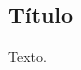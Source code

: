 

\begin{anexosenv}
	\renewcommand{\thechapter}{\arabic{chapter}}
	\partanexos
	\chapter{Título} \label{an:an01}
	
	Texto.
	
\end{anexosenv}


